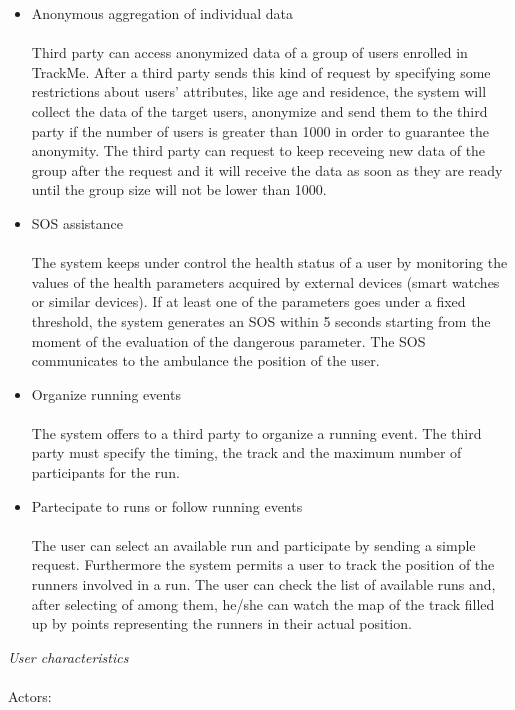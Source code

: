 \documentclass{article}
\begin{document}
\begin{legal}
\begin{legal}
{\begin{itemize}
		\item Anonymous aggregation of individual data\\\\
		Third party can access anonymized data of a group of users enrolled in TrackMe. After a third party sends this kind of request by specifying some restrictions about users’ attributes, like age and residence, the system will collect the data of the target users, anonymize and send them to the third party if the number of users is greater than 1000 in order to guarantee the anonymity. The third party can request to keep receveing new data of the group after the request and it will receive the data as soon as they are ready until the group size will not be lower than 1000.\\
		\item SOS assistance\\\\
		The system keeps under control the health status of a user by monitoring the values of the health parameters acquired by external devices (smart watches or similar devices). If at least one of the parameters goes under a fixed threshold, the system generates an SOS within 5 seconds starting from the moment of the evaluation of the dangerous parameter. The SOS communicates to the ambulance the position of the user.\\
		\item Organize running events\\\\
		The system offers to a third party to organize a running event. The third party must specify the timing, the track and the maximum number of participants for the run.\\
		\item Partecipate to runs or follow running events\\\\
		The user can select an available run and participate by sending a simple request. Furthermore the system permits a user to track the position of the runners involved in a run. The user can check the list of available runs and, after selecting of among them, he/she can watch the map of the track filled up by points representing the runners in their actual position. \\
		\end{itemize}
		}
		\item \textit{User characteristics} \\\\
			{\normalfont
			Actors:\\
}
\end{legal}
\end{legal}
\end{document}
